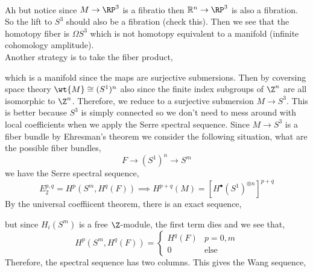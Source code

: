 \documentclass[12pt]{article}
\begin{document}
\bigskip\\
Ah but notice since $M \to \RP^3$ is a fibratio then $\R^n \to \RP^3$ is also a fibration. So the lift to $S^3$ should also be a fibration (check this). Then we see that the homotopy fiber is $\Omega S^3$ which is not homotopy equivalent to a manifold (infinite cohomology amplitude). 
\bigskip\\
Another strategy is to take the fiber product,
\begin{center}
\end{center}
which is a manifold since the maps are surjective submersions. Then by coversing space theory $\wt{M} \cong (S^1)^n$ also since the finite index subgroups of $\Z^n$ are all isomorphic to $\Z^n$. Therefore, we reduce to a surjective submersion $M \to S^3$. This is better because $S^3$ is simply connected so we don't need to mess around with local coefficients when we apply the Serre spectral sequence. Since $M \to S^3$ is a fiber bundle by Ehresman's theorem we consider the following situation, what are the possible fiber bundles,
\[ F \to (S^1)^n \to S^m \]
we have the Serre spectral sequence,
\[ E^{p,q}_2 = H^p(S^m, H^q(F)) \implies H^{p+q}(M) = [H^\bullet(S^1)^{\otimes n}]^{p+q} \]
By the universal coeffiicent theorem, there is an exact sequence,
\begin{center}
\end{center}
but since $H_i(S^m)$ is a free $\Z$-module, the first term dies and we see that,
\[ H^p(S^m, H^q(F)) = \begin{cases}
H^q(F) & p = 0,m
\\
0 & \text{else}
\end{cases} \]
Therefore, the spectral sequence has two columns. This gives the Wang sequence,
\begin{center}
\end{center}
\end{document}
